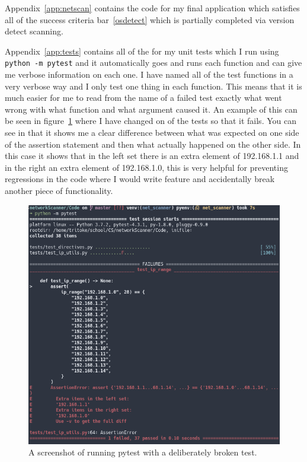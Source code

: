 \documentclass[titlepage]{article}
\begin{document}
Appendix~\ref{app:netscan} contains the code for my final application which satisfies all of the success
criteria bar~\ref{osdetect} which is partially completed via version detect scanning.

Appendix~\ref{app:tests} contains all of the for my unit tests which I run using \verb|python -m pytest|
and it automatically goes and runs each function and can give me verbose information on each one.
I have named all of the test functions in a very verbose way and I only test one thing in each function.
This means that it is much easier for me to read from the name of a failed test exactly what went wrong
with what function and what argument caused it. An example of this can be seen in figure~\ref{testing}
where I have changed on of the tests so that it fails. You can see in that it shows me a clear difference
between what was expected on one side of the assertion statement and then what actually happened on the
other side. In this case it shows that in the left set there is an extra element of 192.168.1.1 and in
the right an extra element of 192.168.1.0, this is very helpful for preventing regressions in the code
where I would write feature and accidentally break another piece of functionality.

\begin{figure}[H]
  \centering
  \includegraphics[width=\textwidth]{testing.png}
  \caption{%
    A screenshot of running pytest with a deliberately broken test.
  }\label{testing}
\end{figure}
\end{document}
